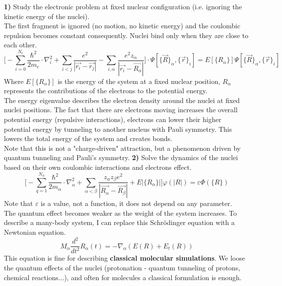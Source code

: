 \textbf{1)} Study the electronic problem at fixed nuclear configuration (i.e. ignoring the kinetic energy of the nuclei).\\
The first fragment is ignored (no motion, no kinetic energy) and the coulombic repulsion becomes constant consequently. Nuclei bind only when they are close to each other.
\[
\bigg[-\sum_{i=0}^{N_e}\frac{\hbar^2}{2m_e}\cdot\nabla^2_i
+\sum_{i<j}\frac{e^2}{|\vec{r_i}-\vec{r_j}|}
-\sum_{i,\alpha}\frac{e^2z_{\alpha}}{|\vec{r_i}-\vec{R_{\alpha}}|}\bigg]\cdot\Psi[\{\vec{R}\}_{\alpha},\{\vec{r}\}_i] =E[\{R_{\alpha}\}]\Psi[\{\vec{R}\}_{\alpha},\{\vec{r}\}_i]
\]
Where $E[\{R_{\alpha}\}]$ is the energy of the system at a fixed nuclear position, ${R_{\alpha}}$ represents the contributions of the electrons to the potential energy.\\
The energy eigenvalue describes the electron density around the nuclei at fixed nuclei positions. The fact that there are electrons moving increases the overall potential energy (repulsive interactions), electrons can lower their higher potential energy by tunneling to another nucleus with Pauli symmetry. This lowers the total energy of the system and creates bonds.\\ 
Note that this is not a "charge-driven" attraction, but a phenomenon driven by quantum tunneling and Pauli's symmetry. 
\newline
\textbf{2)} Solve the dynamics of the nuclei based on their own coulombic interactions and electrons effect.
\[
\bigg[-\sum_{q=1}^{N_{\alpha}}\frac{\hbar^2}{2m_{\alpha}}\cdot\nabla_{\alpha}^2
+\sum_{\alpha<\beta}\frac{z_{\alpha}z_{\beta}e^2}{|\vec{R_{\alpha}}-\vec{R_{\beta}}|}+E|\{R_\alpha\}| \bigg]\varphi(|R|)=\varepsilon\varPhi(\{R\})
\]
Note that $\varepsilon$ is a value, not a function, it does not depend on any parameter.\\
The quantum effect becomes weaker as the weight of the system increases. To describe a many-body system, I can replace this Schr\"odinger equation with a Newtonian equation.\\
\[
M_\alpha\frac{d^2}{dt^2}R_\alpha(t)=-\nabla_\alpha(E(R)+E_t(R))
\]
This equation is fine for describing \textbf{classical molecular simulations}. We loose the quantum effects of the nuclei (protonation - quantum tunneling of protons, chemical reactions...), and often for molecules a classical formulation is enough.

